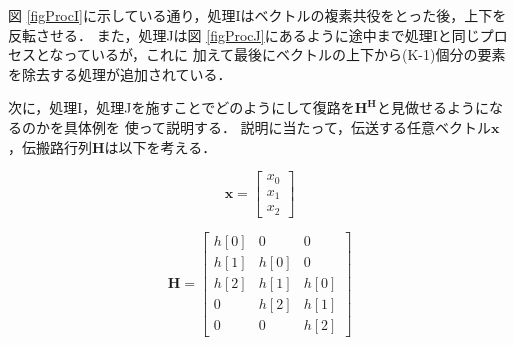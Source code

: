 図 \ref{figProcI}に示している通り，処理Iはベクトルの複素共役をとった後，上下を反転させる．
また，処理Jは図 \ref{figProcJ}にあるように途中まで処理Iと同じプロセスとなっているが，これに
加えて最後にベクトルの上下から(K-1)個分の要素を除去する処理が追加されている．

次に，処理I，処理Jを施すことでどのようにして復路を$\bm{H^H}$と見做せるようになるのかを具体例を
使って説明する．
説明に当たって，伝送する任意ベクトル$\bm{x}$，伝搬路行列$\bm{H}$は以下を考える．

\begin{equation}
    \bm{x} = \left[
        \begin{array}{c}
            x_0 \\
            x_1 \\
            x_2
        \end{array}
    \right]
\end{equation}

\begin{equation}
    \bm{H} = \left[
        \begin{array}{ccc}
            h[0] & 0 & 0 \\
            h[1] & h[0] & 0 \\
            h[2] & h[1] & h[0] \\
            0 & h[2] & h[1] \\
            0 & 0 & h[2]
        \end{array}
    \right]
\end{equation}

